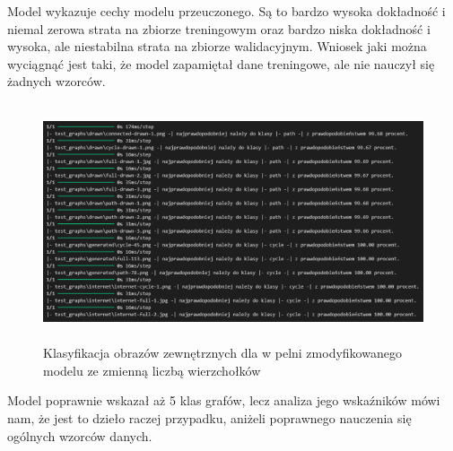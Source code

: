 Model wykazuje cechy modelu przeuczonego.
Są to bardzo wysoka dokładność i niemal zerowa strata na zbiorze treningowym
oraz bardzo niska dokładność i wysoka, ale niestabilna strata na zbiorze walidacyjnym.
Wniosek jaki można wyciągnąć jest taki, że model zapamiętał dane treningowe, ale nie nauczył się żadnych wzorców.

\begin{figure}[ht]
	\centering
	\includegraphics[height=7cm]{resources/tests/images/v4/multiple_edges_txt.png}
	\caption{Klasyfikacja obrazów zewnętrznych dla w pelni zmodyfikowanego modelu ze zmienną liczbą wierzchołków}
	\label{Fig:tests-var-2b}
\end{figure}
\FloatBarrier

Model poprawnie wskazał aż 5 klas grafów, lecz analiza jego wskaźników mówi nam,
że jest to dzieło raczej przypadku, aniżeli poprawnego nauczenia się ogólnych wzorców danych.